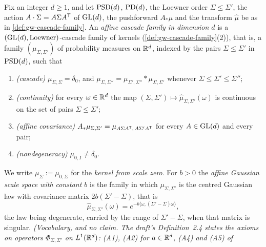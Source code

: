 \begin{definition}
\label{def:affine-cascade-family}
\leanok
Fix an integer $d \ge 1$, and let $\mathrm{PSD}(d)$, $\mathrm{PD}(d)$, the Loewner order $\Sigma \le \Sigma'$, the
action $A \cdot \Sigma = A\Sigma A^{\mathsf{T}}$ of $\mathrm{GL}(d)$, the pushforward $A_*\mu$ and the transform
$\widehat\mu$ be as in \ref{def:gw-cascade-family}. An \emph{affine cascade family in dimension
$d$} is a $(\mathrm{GL}(d), \text{Loewner})$-cascade family of kernels (\ref{def:gw-cascade-family}(2)),
that is, a family $(\mu_{\Sigma,\Sigma'})$ of probability measures on $\mathbb{R}^d$, indexed by the pairs
$\Sigma \le \Sigma'$ in $\mathrm{PSD}(d)$, such that
\begin{enumerate}
\item[(K1)] \emph{(cascade)} $\mu_{\Sigma,\Sigma} = \delta_0$, and
$\mu_{\Sigma,\Sigma''} = \mu_{\Sigma',\Sigma''} * \mu_{\Sigma,\Sigma'}$ whenever
$\Sigma \le \Sigma' \le \Sigma''$;
\item[(K2)] \emph{(continuity)} for every $\omega \in \mathbb{R}^d$ the map
$(\Sigma,\Sigma') \mapsto \widehat\mu_{\Sigma,\Sigma'}(\omega)$ is continuous on the set of
pairs $\Sigma \le \Sigma'$;
\item[(K3)] \emph{(affine covariance)} $A_*\mu_{\Sigma,\Sigma'} = \mu_{A\Sigma A^{\mathsf{T}},\,A\Sigma'A^{\mathsf{T}}}$
for every $A \in \mathrm{GL}(d)$ and every pair;
\item[(K4)] \emph{(nondegeneracy)} $\mu_{0,I} \ne \delta_0$.
\end{enumerate}
We write $\mu_\Sigma := \mu_{0,\Sigma}$ for the \emph{kernel from scale zero}. For $b > 0$ the
\emph{affine Gaussian scale space with constant $b$} is the family in which $\mu_{\Sigma,\Sigma'}$
is the centred Gaussian law with covariance matrix $2b(\Sigma' - \Sigma)$, that is
\begin{equation}\label{eq:affine-gaussian}
  \widehat\mu_{\Sigma,\Sigma'}(\omega) = e^{-b\langle\omega,(\Sigma'-\Sigma)\omega\rangle} ,
\end{equation}
the law being degenerate, carried by the range of $\Sigma' - \Sigma$, when that matrix is singular.
\statusT\quad\emph{(Vocabulary, and no claim. The draft's Definition~2.4 states the axioms on
operators $\Phi_{\Sigma,\Sigma'}$ on $L^1(\mathbb{R}^d)$: (A1), (A2) for $a \in \mathbb{R}^d$, (A4) and (A5) of
}
\end{definition}
